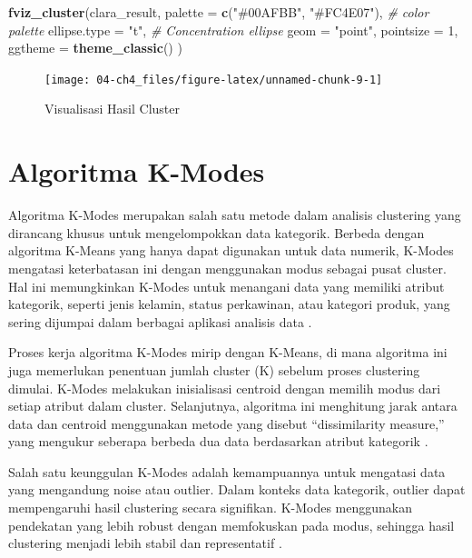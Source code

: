 \documentclass[
  oneside]{book}
\newenvironment{Shaded}{\begin{snugshade}}{\end{snugshade}}
\newcommand{\AttributeTok}[1]{\textcolor[rgb]{0.13,0.29,0.53}{#1}}
\newcommand{\CommentTok}[1]{\textcolor[rgb]{0.56,0.35,0.01}{\textit{#1}}}
\newcommand{\DecValTok}[1]{\textcolor[rgb]{0.00,0.00,0.81}{#1}}
\newcommand{\FunctionTok}[1]{\textcolor[rgb]{0.13,0.29,0.53}{\textbf{#1}}}
\newcommand{\NormalTok}[1]{#1}
\newcommand{\StringTok}[1]{\textcolor[rgb]{0.31,0.60,0.02}{#1}}
\begin{document}
\begin{Shaded}
\begin{Highlighting}[]
\FunctionTok{fviz\_cluster}\NormalTok{(clara\_result,}
\AttributeTok{palette =} \FunctionTok{c}\NormalTok{(}\StringTok{"\#00AFBB"}\NormalTok{, }\StringTok{"\#FC4E07"}\NormalTok{), }\CommentTok{\# color palette}
\AttributeTok{ellipse.type =} \StringTok{"t"}\NormalTok{, }\CommentTok{\# Concentration ellipse}
\AttributeTok{geom =} \StringTok{"point"}\NormalTok{, }\AttributeTok{pointsize =} \DecValTok{1}\NormalTok{,}
\AttributeTok{ggtheme =} \FunctionTok{theme\_classic}\NormalTok{()}
\NormalTok{)}
\end{Highlighting}
\end{Shaded}

\begin{figure}[h]

{\centering \texttt{[image: 04-ch4\_files/figure-latex/unnamed-chunk-9-1]} 

}

\caption{Visualisasi Hasil Cluster}\label{fig:unnamed-chunk-9}
\end{figure}

\chapter{Algoritma K-Modes}\label{kmods}

Algoritma K-Modes merupakan salah satu metode dalam analisis clustering
yang dirancang khusus untuk mengelompokkan data kategorik. Berbeda
dengan algoritma K-Means yang hanya dapat digunakan untuk data numerik,
K-Modes mengatasi keterbatasan ini dengan menggunakan modus sebagai
pusat cluster. Hal ini memungkinkan K-Modes untuk menangani data yang
memiliki atribut kategorik, seperti jenis kelamin, status perkawinan,
atau kategori produk, yang sering dijumpai dalam berbagai aplikasi
analisis data \citep{handayani2020}.

Proses kerja algoritma K-Modes mirip dengan K-Means, di mana algoritma
ini juga memerlukan penentuan jumlah cluster (K) sebelum proses
clustering dimulai. K-Modes melakukan inisialisasi centroid dengan
memilih modus dari setiap atribut dalam cluster. Selanjutnya, algoritma
ini menghitung jarak antara data dan centroid menggunakan metode yang
disebut ``dissimilarity measure,'' yang mengukur seberapa berbeda dua data
berdasarkan atribut kategorik \citep{buulolo2020}.

Salah satu keunggulan K-Modes adalah kemampuannya untuk mengatasi data
yang mengandung noise atau outlier. Dalam konteks data kategorik,
outlier dapat mempengaruhi hasil clustering secara signifikan. K-Modes
menggunakan pendekatan yang lebih robust dengan memfokuskan pada modus,
sehingga hasil clustering menjadi lebih stabil dan representatif
\citep{hardandy2017}.
\end{document}
